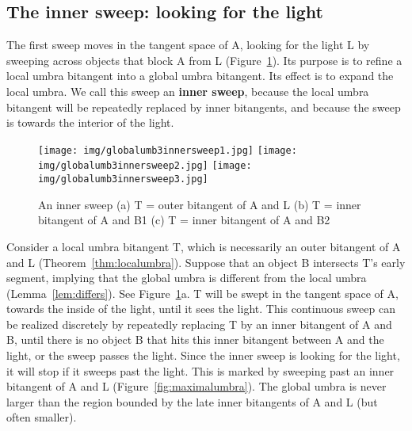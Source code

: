 \documentclass[9pt,twocolumn]{article}
\begin{document}
\clearpage

\subsection{The inner sweep: looking for the light}
\label{sec:innersweep}

The first sweep moves in the tangent space of A,
looking for the light L by sweeping across objects that block A from L
(Figure~\ref{fig:innersweep2}).
Its purpose is to refine a local umbra bitangent into a global umbra
bitangent.
Its effect is to expand the local umbra.
We call this sweep an {\bf inner sweep},
because the local umbra bitangent will be repeatedly replaced by 
inner bitangents, and because the sweep is towards the interior of the light.

\begin{figure}
\begin{center}
\texttt{[image: img/globalumb3innersweep1.jpg]}
\texttt{[image: img/globalumb3innersweep2.jpg]}
\texttt{[image: img/globalumb3innersweep3.jpg]}
\end{center}
\caption{An inner sweep
	 (a) T = outer bitangent of A and L
	 (b) T = inner bitangent of A and B1
	 (c) T = inner bitangent of A and B2}
\label{fig:innersweep2}
\end{figure}

Consider a local umbra bitangent T, 
which is necessarily an outer bitangent of A and L (Theorem~\ref{thm:localumbra}).
Suppose that an object B intersects T's early segment,
implying that the global umbra is different from the local umbra
(Lemma~\ref{lem:differs}).
See Figure~\ref{fig:innersweep2}a.
T will be swept in the tangent space of A, 
towards the inside of the light, until it sees the light.
This continuous sweep can be realized discretely by
repeatedly replacing T by an inner bitangent of A and B,
until there is no object B that hits this inner bitangent
between A and the light, or the sweep passes the light.
Since the inner sweep is looking for the light,
it will stop if it sweeps past the light.
This is marked by sweeping past an inner bitangent of A and L (Figure~\ref{fig:maximalumbra}).
The global umbra is never larger than 
the region bounded by the late inner bitangents of A and L (but often smaller).
\end{document}
